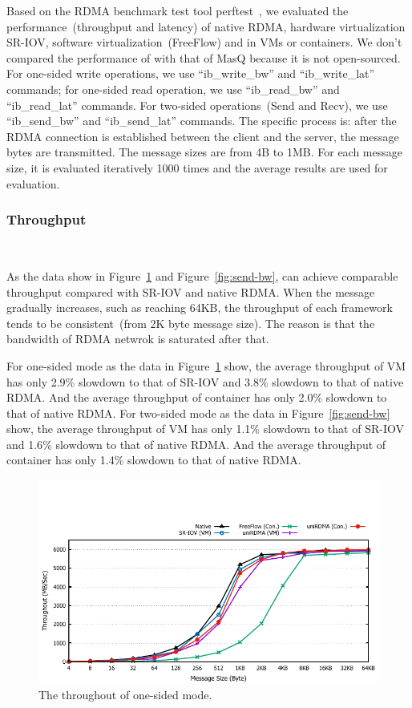 Based on the RDMA benchmark test tool perftest~\cite{perftest}, we evaluated the performance~(throughput and latency) of native RDMA, hardware virtualization SR-IOV,  software virtualization~(FreeFlow) and \sys in VMs or containers. We don't compared the performance of \sys with that of MasQ because it is not open-sourced. For one-sided write operations, we use ``ib\_write\_bw'' and ``ib\_write\_lat'' commands; for one-sided read operation, we use ``ib\_read\_bw'' and ``ib\_read\_lat'' commands. For two-sided operations~(Send and Recv), we use ``ib\_send\_bw'' and ``ib\_send\_lat'' commands. The specific process is: after the RDMA connection is established between the client and the server, the message bytes are transmitted. The message sizes are from 4B to 1MB. For each message size,  it is evaluated iteratively 1000 times and the average results are used for evaluation.  

\subsubsection{\textbf{Throughput}}
\
\noindent

As the data show in Figure~\ref{fig:write-bw} and Figure~\ref{fig:send-bw}, \sys can achieve comparable throughput compared with SR-IOV and native RDMA. When the message gradually increases, such as reaching 64KB, the throughput of each framework tends to be consistent~(from 2K byte message size). The reason is that the bandwidth of RDMA netwrok is saturated after that. %

For one-sided mode as the data in Figure~\ref{fig:write-bw} show, the average throughput of \sys VM has only 2.9$\%$ slowdown to that of SR-IOV and 3.8$\%$ slowdown to that of native RDMA. And the average throughput of \sys container has only 2.0$\%$ slowdown to that of native RDMA. For two-sided mode as the data in Figure~\ref{fig:send-bw} show, the average throughput of \sys VM has only 1.1$\%$ slowdown to that of SR-IOV and 1.6$\%$ slowdown to that of native RDMA. And the average throughput of \sys container has only 1.4$\%$ slowdown to that of native RDMA.



\begin{figure}[!ht]
	\centering
	\includegraphics[width=1.0\linewidth]{images/write-bw.pdf}
	\caption{The throughout of one-sided mode.}
	\label{fig:write-bw}
\end{figure}


